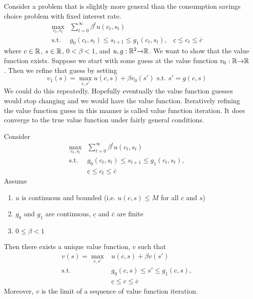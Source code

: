 Consider a problem that is slightly more general than the consumption
savings choice problem with fixed interest rate.
\begin{align*}
  \max_{c_t,s_t} & \sum_{t=0}^\infty \beta^t u(c_t,s_t) \\
  \text{s.t.} & g_0(c_t,s_t) \leq s_{t+1} \leq g_1(c_t,s_t),
  & \underline{c} \leq c_t \leq \overline{c}
\end{align*}
where $c \in \mathbb{R}$, $s \in \mathbb{R}$, $0<\beta<1$, and $u,g:\mathbb{R}^2 {\rightarrow} \mathbb{R}$.
We want to show that the value function exists. Suppose we start with
some guess at the value function $v_0:\mathbb{R}{\rightarrow} \mathbb{R}$. Then we refine that guess by
setting 
\[ v_1(s) = \max_{c,s'} u(c,s) + \beta v_0(s') \text{ s.t. }
s'=g(c,s) \]
We could do this repeatedly. Hopefully eventually the value function guesses
would stop changing and we would have the value function. Iteratively 
refining the value function guess in this manner is called value
function iteration. It does converge to the true value function under
fairly general conditions.
\begin{theorem}
  Consider 
  \begin{align*}
    \max_{c_t,s_t} & \sum_{t=0}^\infty \beta^t u(c_t,s_t) \\
    \text{s.t.} & g_0(c_t,s_t) \leq s_{t+1} \leq g_1(c_t,s_t), \\
    & \underline{c} \leq c_t \leq \overline{c}
  \end{align*}
  Assume 
  \begin{enumerate}
  \item $u$ is continuous and bounded (i.e. $u(c,s) \leq M$ for all
    $c$ and $s$)
  \item $g_0$ and $g_1$ are continuous, $\underline{c}$ and
    $\overline{c}$ are finite
  \item $0 \leq \beta < 1$
  \end{enumerate}
  Then there exists a unique value function, $v$ such that
  \begin{align*} v(s) = \max_{c,s'} & u(c,s) + \beta v(s') \\
    \text{s.t.} & g_0(c,s) \leq s' \leq g_1(c,s),\\
    & \underline{c} \leq c \leq \overline{c}
  \end{align*}
  Moreover, $v$ is the limit of a sequence of value function
  iteration.
\end{theorem}
